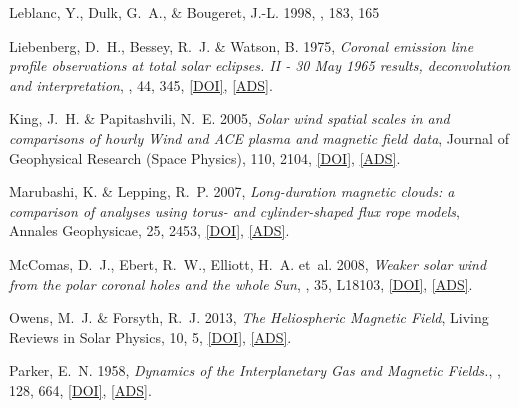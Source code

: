 	{Leblanc}, Y., {Dulk}, G.~A., \& {Bougeret}, J.-L. 1998, \solphys, 183, 165

	{Liebenberg}, D.~H., {Bessey}, R.~J. \& {Watson}, B. 1975, \emph{{Coronal
	emission line profile observations at total solar eclipses. II - 30 May 1965
	results, deconvolution and interpretation}}, \solphys, 44, 345,
	\href{http://dx.doi.org/10.1007/BF00153213}{[DOI]},
	\href{http://adsabs.harvard.edu/abs/1975SoPh...44..345L}{[ADS]}.

	{King}, J.~H. \& {Papitashvili}, N.~E. 2005, \emph{{Solar wind spatial scales
	in and comparisons of hourly Wind and ACE plasma and magnetic field data}},
	Journal of Geophysical Research (Space Physics), 110, 2104,
	\href{http://dx.doi.org/10.1029/2004JA010649}{[DOI]},
	\href{http://adsabs.harvard.edu/abs/2005JGRA..110.2104K}{[ADS]}.

	{Marubashi}, K. \& {Lepping}, R.~P. 2007, \emph{{Long-duration magnetic clouds:
	a comparison of analyses using torus- and cylinder-shaped flux rope models}},
	Annales Geophysicae, 25, 2453,
	\href{http://dx.doi.org/10.5194/angeo-25-2453-2007}{[DOI]},
	\href{http://adsabs.harvard.edu/abs/2007AnGeo..25.2453M}{[ADS]}.
	
	{McComas}, D.~J., {Ebert}, R.~W., {Elliott}, H.~A. {et~al.} 2008{},
	\emph{{Weaker solar wind from the polar coronal holes and the whole Sun}},
	\grl, 35, L18103, \href{http://dx.doi.org/10.1029/2008GL034896}{[DOI]},
	\href{http://adsabs.harvard.edu/abs/2008GeoRL..3518103M}{[ADS]}.

	{Owens}, M.~J. \& {Forsyth}, R.~J. 2013, \emph{{The Heliospheric Magnetic
	Field}}, Living Reviews in Solar Physics, 10, 5,
	\href{http://dx.doi.org/10.12942/lrsp-2013-5}{[DOI]},
	\href{http://adsabs.harvard.edu/abs/2013LRSP...10....5O}{[ADS]}.

	{Parker}, E.~N. 1958, \emph{{Dynamics of the Interplanetary Gas and Magnetic Fields.}}, \apj, 128, 664, \href{http://dx.doi.org/10.1086/146579}{[DOI]}, \href{http://adsabs.harvard.edu/abs/1958ApJ...128..664P}{[ADS]}.

